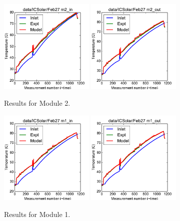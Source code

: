 \documentclass{article}
\begin{document}
\clearpage
\begin{figure}[!ht]
\centering
\includegraphics[width=0.4\textwidth]{../../data/ICSolar/images/Feb27_m2_in.pdf}\hspace{0.05\textwidth}
\includegraphics[width=0.4\textwidth]{../../data/ICSolar/images/Feb27_m2_out.pdf}\hspace{0.05\textwidth}\\
\caption{Results for Module 2.}\end{figure}
\begin{figure}[!ht]
\centering
\includegraphics[width=0.4\textwidth]{../../data/ICSolar/images/Feb27_m1_in.pdf}\hspace{0.05\textwidth}
\includegraphics[width=0.4\textwidth]{../../data/ICSolar/images/Feb27_m1_out.pdf}\hspace{0.05\textwidth}\\
\caption{Results for Module 1.}\end{figure}
\end{document}
